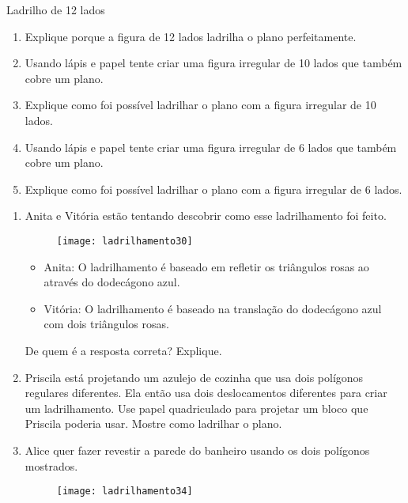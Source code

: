 {\begin{task}{Ladrilho de 12 lados}
	\begin{enumerate}
		\item Explique porque a figura de 12 lados ladrilha o plano perfeitamente.
		\item Usando lápis e papel tente criar uma figura irregular de 10 lados que também cobre um plano.
		\item Explique como foi possível ladrilhar o plano com a figura irregular de 10 lados.
		\item Usando lápis e papel tente criar uma figura irregular de 6 lados que também cobre um plano.
		\item Explique como foi possível ladrilhar o plano com a figura irregular de 6 lados.
	\end{enumerate}
	
\end{task}


\exercise

\begin{enumerate}

	\item Anita e Vitória estão tentando descobrir como esse ladrilhamento foi feito.

	\begin{figure}[H]
	\centering
	\texttt{[image: ladrilhamento30]}

	\end{figure}

	\begin{itemize}
	\item Anita: O ladrilhamento é baseado em refletir os triângulos rosas ao através do dodecágono azul.
	\item Vitória: O ladrilhamento é baseado na translação do dodecágono azul com dois triângulos rosas.
	\end{itemize}

	De quem é a resposta correta? Explique.


	\item Priscila está projetando um azulejo de cozinha que usa dois polígonos regulares diferentes. Ela então usa dois deslocamentos diferentes para criar um ladrilhamento. Use papel quadriculado para projetar um bloco que Priscila poderia usar. Mostre como ladrilhar o plano.

	\item Alice quer fazer revestir a parede do banheiro usando os dois polígonos mostrados.

	\begin{figure}[H]
	\centering
	\texttt{[image: ladrilhamento34]}


\end{figure}
\end{enumerate}}
